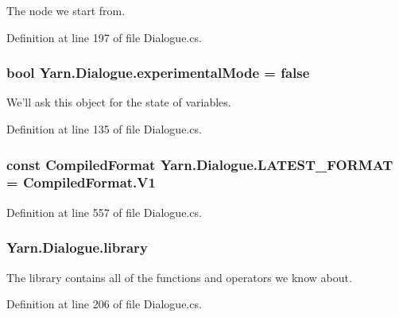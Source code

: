 The node we start from. 



Definition at line 197 of file Dialogue.\-cs.

\hypertarget{a00094_a2a5ac23441861eef13c59044cc218f09}{
\subsubsection[{experimental\-Mode}]{\setlength{\rightskip}{0pt plus 5cm}bool Yarn.\-Dialogue.\-experimental\-Mode = false}}\label{a00094_a2a5ac23441861eef13c59044cc218f09}


We'll ask this object for the state of variables. 



Definition at line 135 of file Dialogue.\-cs.

\hypertarget{a00094_a3bc83587462ade6a2f7f42cb7576e50e}{
\subsubsection[{L\-A\-T\-E\-S\-T\-\_\-\-F\-O\-R\-M\-A\-T}]{\setlength{\rightskip}{0pt plus 5cm}const {\bf Compiled\-Format} Yarn.\-Dialogue.\-L\-A\-T\-E\-S\-T\-\_\-\-F\-O\-R\-M\-A\-T = Compiled\-Format.\-V1}}\label{a00094_a3bc83587462ade6a2f7f42cb7576e50e}


Definition at line 557 of file Dialogue.\-cs.

\hypertarget{a00094_ae660d4cfb6e296358d2f61d8ee74c66a}{
\subsubsection[{library}]{ Yarn.\-Dialogue.\-library}}\label{a00094_ae660d4cfb6e296358d2f61d8ee74c66a}


The library contains all of the functions and operators we know about. 



Definition at line 206 of file Dialogue.\-cs.



